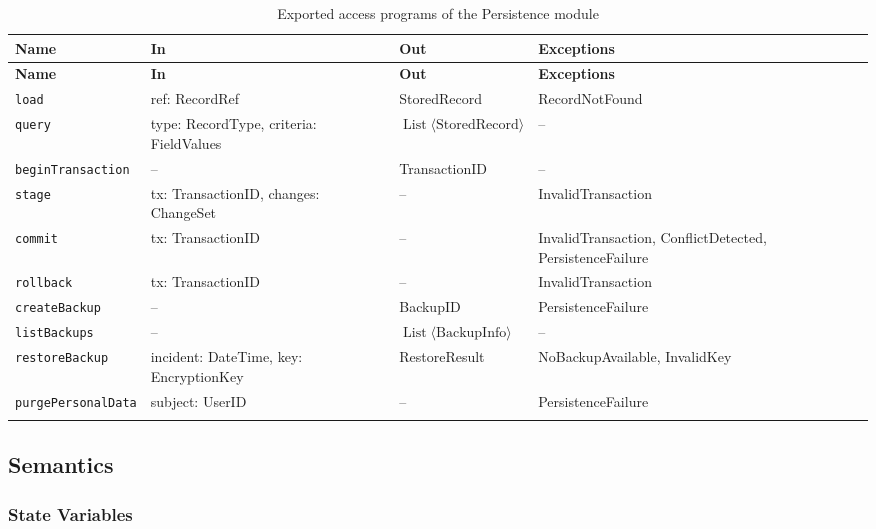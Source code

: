 \documentclass[12pt, titlepage]{article}
\begin{document}
\begingroup
\small
\setlength{\tabcolsep}{4pt}
\renewcommand{\arraystretch}{1.2}
\begin{longtable}{>{\raggedright\arraybackslash}p{}
        >{\raggedright\arraybackslash}p{}
        >{\raggedright\arraybackslash}p{}
        >{\raggedright\arraybackslash}p{}}
    \toprule
    \textbf{Name} & \textbf{In} & \textbf{Out} & \textbf{Exceptions} \\
    \midrule
    \endfirsthead
    \toprule
    \textbf{Name} & \textbf{In} & \textbf{Out} & \textbf{Exceptions} \\
    \midrule
    \endhead
    \endfoot
    \texttt{load} & ref: RecordRef & StoredRecord & RecordNotFound \\
    \texttt{query} & type: RecordType, criteria: FieldValues & $\operatorname{List}\langle\text{StoredRecord}\rangle$ & -- \\
    \texttt{beginTransaction} & -- & TransactionID & -- \\
    \texttt{stage} & tx: TransactionID, changes: ChangeSet & -- & InvalidTransaction \\
    \texttt{commit} & tx: TransactionID & -- & InvalidTransaction, ConflictDetected, PersistenceFailure \\
    \texttt{rollback} & tx: TransactionID & -- & InvalidTransaction \\
    \texttt{createBackup} & -- & BackupID & PersistenceFailure \\
    \texttt{listBackups} & -- & $\operatorname{List}\langle\text{BackupInfo}\rangle$ & -- \\
    \texttt{restoreBackup} & incident: DateTime, key: EncryptionKey & RestoreResult & NoBackupAvailable, InvalidKey \\
    \texttt{purgePersonalData} & subject: UserID & -- & PersistenceFailure \\
    \bottomrule
    \caption{Exported access programs of the Persistence module}
    \label{TblPersistenceAccessPrograms}
\end{longtable}
\endgroup

\subsection{Semantics}

\subsubsection{State Variables}
\end{document}

